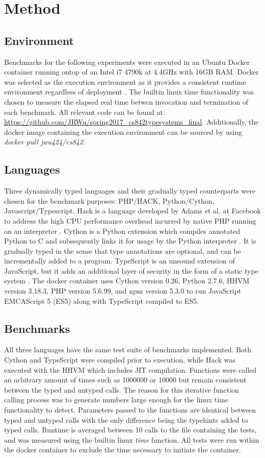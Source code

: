 \section{Method}
\subsection{Environment}
Benchmarks for the following experiments were executed in an Ubuntu Docker container running ontop of an Intel i7 4790k at 4.4GHz with 16GB RAM. Docker was selected as the execution environment as it provides a consistent runtime environment regardless of deployment \cite{Merkel:2014:DLL:2600239.2600241}. The builtin linux time functionality was chosen to measure the elapsed real time betwen invocation and termination of each benchmark. All relevant code can be found at: \url{https://github.com/JRWu/spring2017_cs842typesystems_final}. Additionally, the docker image containing the execution environment can be sourced by using \textit{docker pull jwu424/cs842}. 

\subsection{Languages}
Three dynamically typed languages and their gradually typed counterparts were chosen for the benchmark purposes: PHP/HACK, Python/Cython, Javascript/Typescript. Hack is a language developed by Adams et al. at Facebook to address the high CPU performance overhead incurred by native PHP running on an interpreter \cite{Adams:2014:HVM:2660193.2660199}. Cython is a Python extension which compiles annotated Python to C and subsequently links it for usage by the Python interpreter \cite{behnel2011cython}. It is gradually typed in the sense that type annotations are optional, and can be incrementally added to a program. TypeScript is an unsound extension of JavaScript, but it adds an additional layer of security in the form of a static type system \cite{bierman2014understanding}. The docker container uses Cython version 0.26, Python 2.7.6, HHVM version 3.18.3, PHP version 5.6.99, and npm version 5.3.0 to run JavaScript EMCAScript 5 (ES5) along with TypeScript compiled to ES5.

\subsection{Benchmarks}
All three languages have the same test suite of benchmarks implemented. Both Cython and TypeScript were compiled prior to execution, while Hack was executed with the HHVM which includes JIT compilation. Functions were called an arbitrary amount of times such as 1000000 or 10000 but remain consistent between the typed and untyped calls. The reason for this iterative function calling process was to generate numbers large enough for the linux time functionality to detect. Parameters passed to the functions are identical between typed and untyped calls with the only difference being the typehints added to typed calls. Runtime is averaged between 10 calls to the file containing the tests, and was measured using the builtin linux \textit{time} function. All tests were run within the docker container to exclude the time necessary to initiate the container. 

